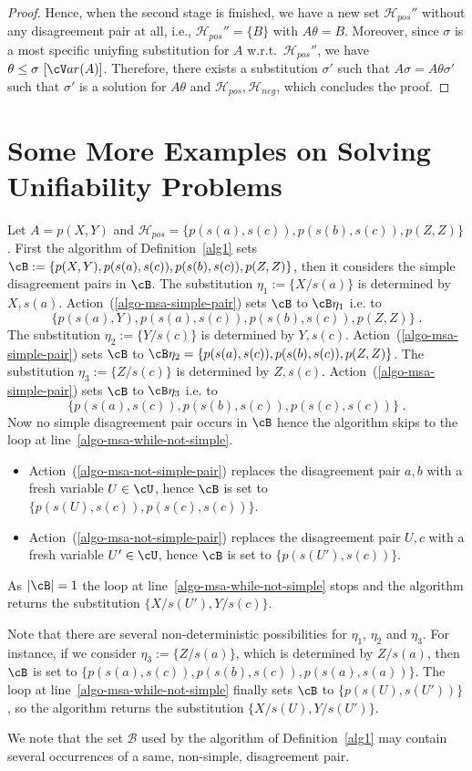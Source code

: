 \documentclass[fleqn]{tlp}
\newcommand{\var}{{\cV}ar}
\newcommand{\Hpos}{\mathcal{H}_{\mathit{pos}}}
\newcommand{\Hneg}{\mathcal{H}_{\mathit{neg}}}
\begin{document}
\begin{appendix}
\begin{proof}
  Hence, when the second stage is finished, we have a new set
  $\Hpos''$ without any disagreement pair at all, i.e.,
  $\Hpos''=\{B\}$ with $A\theta=B$. Moreover, since $\sigma$ is a most
  specific uniyfing substitution for $A$ w.r.t.\ $\Hpos''$, we have
  $\theta\leq\sigma~[\var(A)]$. Therefore, there exists a substitution
  $\sigma'$ such that $A\sigma=A\theta\sigma'$ such that $\sigma'$ is
  a solution for $A\theta$ and $\Hpos,\Hneg$, which concludes the
  proof.
\end{proof}

\section{Some More Examples on Solving Unifiability Problems}

\begin{example}
  Let $A = p(X,Y)$ and $\Hpos = \{p(s(a),s(c)),p(s(b),s(c)),p(Z,Z)\}$.
  First the algorithm of Definition~\ref{alg1} sets
  $\cB := \{p(X,Y),p(s(a),s(c)),p(s(b),s(c)),p(Z,Z)\}$,
  then it considers the simple disagreement pairs
  in $\cB$. The substitution $\eta_1 := \{X/s(a)\}$
  is determined by $X,s(a)$. Action~(\ref{algo-msa-simple-pair})
  sets $\cB$ to $\cB\eta_1$ i.e. to
  \[\{p(s(a),Y),p(s(a),s(c)),p(s(b),s(c)),p(Z,Z)\}\;.\]
  The substitution $\eta_2 := \{Y/s(c)\}$
  is determined by $Y,s(c)$. Action~(\ref{algo-msa-simple-pair})
  sets $\cB$ to $\cB\eta_2=\{p(s(a),s(c)),p(s(b),s(c)),p(Z,Z)\}$.
  The substitution $\eta_3 := \{Z/s(c)\}$ is determined by
  $Z,s(c)$. Action~(\ref{algo-msa-simple-pair}) sets $\cB$ to
  $\cB\eta_3$ i.e. to
  \[\{p(s(a),s(c)),p(s(b),s(c)),p(s(c),s(c))\}\;.\]
  Now no simple disagreement pair occurs in $\cB$ hence the algorithm
  skips to the loop at line~\ref{algo-msa-while-not-simple}.
  \begin{itemize}
  \item Action~(\ref{algo-msa-not-simple-pair}) replaces 
    the disagreement pair $a,b$ with a
    fresh variable $U\in \cU$, hence $\cB$ is set to
    $\{p(s(U),s(c)),p(s(c),s(c))\}$.
  \item Action~(\ref{algo-msa-not-simple-pair}) replaces 
    the disagreement pair $U,c$
    with a fresh variable $U'\in \cU$, hence $\cB$ is set to
    $\{p(s(U'),s(c))\}$.
  \end{itemize}
  As $|\cB|=1$ the loop at line~\ref{algo-msa-while-not-simple}
  stops and the algorithm returns the substitution $\{X/s(U'),Y/s(c)\}$.

  Note that there are several non-deterministic possibilities
  for $\eta_1$, $\eta_2$ and $\eta_3$. For instance, if we
  consider $\eta_3:=\{Z/s(a)\}$, which is determined by $Z/s(a)$,
  then $\cB$ is set to $\{p(s(a),s(c)),p(s(b),s(c)),p(s(a),s(a))\}$.
  The loop at line~\ref{algo-msa-while-not-simple} finally sets 
  $\cB$ to $\{p(s(U),s(U'))\}$, so the algorithm returns the substitution
  $\{X/s(U),Y/s(U')\}$.
\end{example}
We note that the set $\mathcal{B}$ used by the algorithm
of Definition~\ref{alg1} may contain several occurrences
of a same, non-simple, disagreement pair.


\end{appendix}
\end{document}
